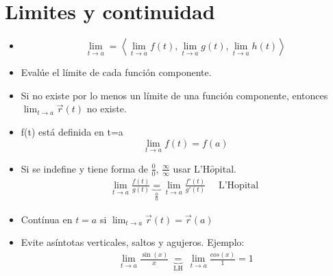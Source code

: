 \documentclass{article}
\begin{document}
\section{Limites y continuidad}
\begin{itemize}
    \item \[
        \lim_{t \to a} = \left\langle \lim_{t \to a} f(t),\lim_{t \to a} g(t),\lim_{t \to a} h(t) \right\rangle 
      \]
    
    \item Evalúe el límite de cada función componente.
    \item Si no existe por lo menos un límite de una función componente, entonces $\lim_{t \to a} \vec{r}(t) $ no existe.
    \item f(t) está definida en t=a
    \[
      \lim_{t \to a} f(t) = f(a)
    \]
    
    \item Si se indefine y tiene forma de $\frac{0}{0} $, $\frac{\infty}{\infty} $ usar L'H$\hat{o}$pital.
        \begin{align*}
            \lim_{t \to a} \frac{f(t)}{g(t)} \underbrace{=}_{\frac{0}{0} } \lim_{t \to a} \frac{f'(t)}{g'(t)} \quad \text{  L'Hopital  }
        \end{align*}
    
    \item Contínua en $t=a$ si $\lim_{t \to a} \vec{r}(t)=\vec{r}(a)$
    \item Evite asíntotas verticales, saltos y agujeros. Ejemplo: 
        \begin{align*} 
            \lim_{t \to a} \frac{\sin(x)}{x} \underbrace{=}_{\text{  LH  }} \lim_{t \to a} \frac{cos(x)}{1} = 1 \\ 
        \end{align*}
    
\end{itemize}


\end{document}
